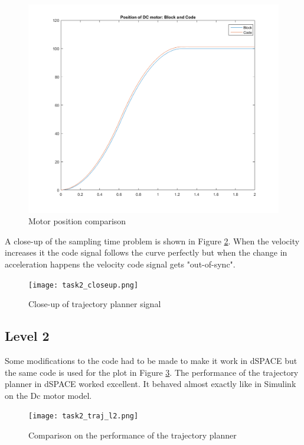 \begin{figure}[H]
	\begin{center}
	
		\includegraphics[width=\linewidth]{task2_position.png}
		\caption{Motor position comparison}
		\label{fig:task2_pos}
	\end{center}
\end{figure}

A close-up of the sampling time problem is shown in Figure \ref{fig:task2_closeup}. When the velocity increases it the code signal follows the curve perfectly but when the change in acceleration happens the velocity code signal gets "out-of-sync".

\begin{figure}[H]
	\begin{center}
	
		\texttt{[image: task2\_closeup.png]}
		\caption{Close-up of trajectory planner signal}
		\label{fig:task2_closeup}
	\end{center}
\end{figure}


\subsection*{Level 2}
Some modifications to the code had to be made to make it work in dSPACE but the same code is used for the plot in Figure \ref{fig:task2_traj_l2}. The performance of the trajectory planner in dSPACE worked excellent. It behaved almost exactly like in Simulink on the Dc motor model. 


\begin{figure}[H]
	\begin{center}
	
		\texttt{[image: task2\_traj\_l2.png]}
		\caption{Comparison on the performance of the trajectory planner}
		\label{fig:task2_traj_l2}
	\end{center}
\end{figure}

%
